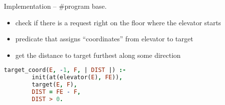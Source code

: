 \documentclass{beamer}
\begin{document}




\begin{frame}[fragile]{Implementation -- \#program base.}

  \begin{itemize}
    \item check if there is a request right on the floor where the elevator starts
    \item predicate that assigns ``coordinates'' from elevator to target
    \item get the distance to target furthest along some direction
  \end{itemize}

\begin{lstlisting}[language=Prolog]
% Create coordinates from elevator to target
target_coord(E, -1, F, | DIST |) :-
        init(at(elevator(E), FE)),
        target(E, F),
        DIST = FE - F,
        DIST > 0.

\end{lstlisting}
\end{frame}

\end{document}

